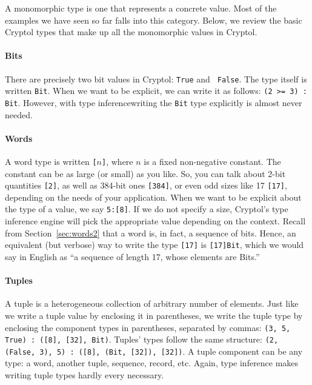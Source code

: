 A monomorphic type is one that represents a concrete value. Most of
the examples we have seen so far falls into this category. Below, we
review the basic Cryptol types that make up all the monomorphic values
in Cryptol.

\paragraph*{Bits}\indTheBitType\indTrue\indFalse There are precisely
two bit values in Cryptol: {\tt True} and {\tt
  False}. The type itself is written {\tt Bit}. When we want to be
explicit, we can write it as follows: {\tt (2 >= 3) : Bit}. However,
with type inference\indTypeInference writing the {\tt Bit} type
explicitly is almost never needed.

\paragraph*{Words}\indTheWordType\indTheBitType A word type is written
{\tt [}$n${\tt ]}, where $n$ is a fixed
non-negative constant. The constant can be as large (or small) as you
like.  So, you can talk about 2-bit quantities {\tt [2]}, as well as
384-bit ones {\tt [384]}, or even odd sizes like 17 {\tt [17]},
depending on the needs of your application. When we want to be
explicit about the type of a value, we say {\tt 5:[8]}. If we do not
specify a size, Cryptol's type inference engine will pick the
appropriate value depending on the context.\indTypeInference
Recall from Section~\ref{sec:words2} that a word is, in fact, a
sequence of bits.  Hence, an equivalent (but verbose) way to write the
type {\tt [17]} is {\tt [17]Bit}, which we would say in English as
``a sequence of length 17, whose elements are Bits.''

\paragraph*{Tuples}\indTheTupleType A tuple is a heterogeneous
collection of arbitrary number of
elements. Just like we write a tuple value by enclosing it in
parentheses, we write the tuple type by enclosing the component types
in parentheses, separated by commas: {\tt (3, 5, True) : ([8], [32],
  Bit)}. Tuples' types follow the same structure: {\tt (2, (False, 3),
  5) : ([8], (Bit, [32]), [32])}.  A tuple component can be any type:
a word, another tuple, sequence, record, etc. Again, type inference
makes writing tuple types hardly every necessary.\indTypeInference

